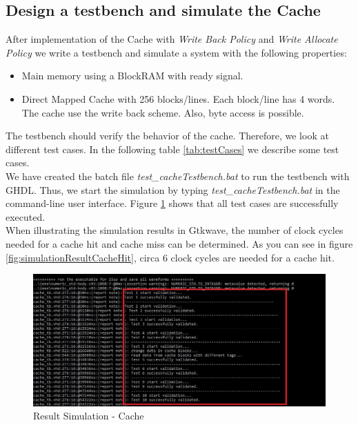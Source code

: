 \subsection{Design a testbench and simulate the Cache}
After implementation of the Cache with \textit{Write Back Policy} and \textit{Write Allocate Policy} we write a testbench and simulate a system with the following properties:
\begin{itemize} 
	\item Main memory using a BlockRAM with ready signal.
	\item Direct Mapped Cache with 256 blocks/lines. Each block/line has 4 words. The cache use the write back scheme. Also, byte access is possible.	
\end{itemize}
The testbench should verify the behavior of the cache. Therefore, we look at different test cases. In the following table \ref{tab:testCases} we describe some test cases.\\
We have created the batch file \textit{test\_cacheTestbench.bat} to run the testbench with GHDL. Thus, we start the simulation by typing \textit{test\_cacheTestbench.bat} in the command-line user interface. Figure \ref{fig:simulationResult} shows that all test cases are successfully executed.\\
When illustrating the simulation results in Gtkwave, the number of clock cycles needed for a cache hit and cache miss can be determined. As you can see in figure \ref{fig:simulationResultCacheHit}, circa 6 clock cycles are needed for a cache hit.
\begin{figure}
	\centering
	\includegraphics[scale=.5]{pictures/simulationResult}
	\caption{Result Simulation - Cache}
	\label{fig:simulationResult}
\end{figure}
